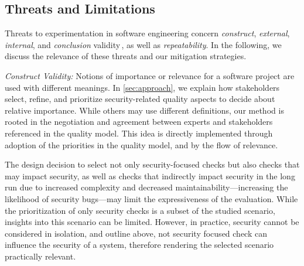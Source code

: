 \subsection{Threats and Limitations}
\label{sec:threats}

Threats to experimentation in software engineering %
concern
\emph{construct}, \emph{external}, \emph{internal}, and \emph{conclusion} validity\,\cite{Jedlitschka2008RES}, as well as \emph{repeatability}.
In the following, we discuss the relevance of these threats and our mitigation strategies.

\textit{Construct Validity:}
%
Notions of importance or relevance for a software project are used with different meanings. %
In \autoref{sec:approach}, we explain %
how stakeholders select, refine, and prioritize security-related quality aspects to decide about relative importance.
While others may use different definitions, our method is rooted in the negotiation and agreement between experts and stakeholders %
referenced in the quality model.
This idea is %
directly implemented through adoption of the priorities in the quality model, and by the flow of relevance.

	The design decision to select not only security-focused checks but also checks that may impact security, as well as checks that indirectly impact security in the long run due to increased complexity and decreased maintainability---increasing the likelihood of security bugs---may limit the expressiveness of the evaluation.
	While the prioritization of only security checks is a subset of the studied scenario, insights into this scenario can be limited.
	However, in practice, security cannot be considered in isolation, and outline above, not security focused check can influence the security of a system, therefore rendering the selected scenario practically relevant.


